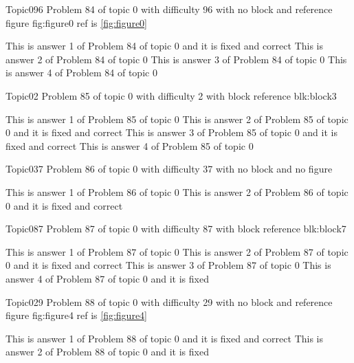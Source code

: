 \documentclass[master]{exam}
\begin{document}
\begin{problem}{Topic0}{96}
	Problem 84 of topic 0 with difficulty 96 with no block and reference figure fig:figure0 ref is \ref{fig:figure0}
	\begin{answers}
		 This is answer 1 of Problem 84 of topic 0 and it is fixed and correct
		\answer This is answer 2 of Problem 84 of topic 0 
		\answer This is answer 3 of Problem 84 of topic 0 
		\answer This is answer 4 of Problem 84 of topic 0 
	\end{answers}
\end{problem}

\begin{problem}[requires=blk:block3]{Topic0}{2}
	Problem 85 of topic 0 with difficulty 2 with block reference blk:block3
	\begin{answers}
		\answer This is answer 1 of Problem 85 of topic 0 
		 This is answer 2 of Problem 85 of topic 0 and it is fixed and correct
		 This is answer 3 of Problem 85 of topic 0 and it is fixed and correct
		\answer This is answer 4 of Problem 85 of topic 0 
	\end{answers}
\end{problem}

\begin{problem}{Topic0}{37}
	Problem 86 of topic 0 with difficulty 37 with no block and no figure
	\begin{answers}
		\answer This is answer 1 of Problem 86 of topic 0 
		 This is answer 2 of Problem 86 of topic 0 and it is fixed and correct
	\end{answers}
\end{problem}

\begin{problem}[requires=blk:block7]{Topic0}{87}
	Problem 87 of topic 0 with difficulty 87 with block reference blk:block7
	\begin{answers}
		\answer This is answer 1 of Problem 87 of topic 0 
		 This is answer 2 of Problem 87 of topic 0 and it is fixed and correct
		\answer This is answer 3 of Problem 87 of topic 0 
		\answer[fixed] This is answer 4 of Problem 87 of topic 0 and it is fixed
	\end{answers}
\end{problem}

\begin{problem}{Topic0}{29}
	Problem 88 of topic 0 with difficulty 29 with no block and reference figure fig:figure4 ref is \ref{fig:figure4}
	\begin{answers}
		 This is answer 1 of Problem 88 of topic 0 and it is fixed and correct
		\answer[fixed] This is answer 2 of Problem 88 of topic 0 and it is fixed
	\end{answers}
\end{problem}
\end{document}
